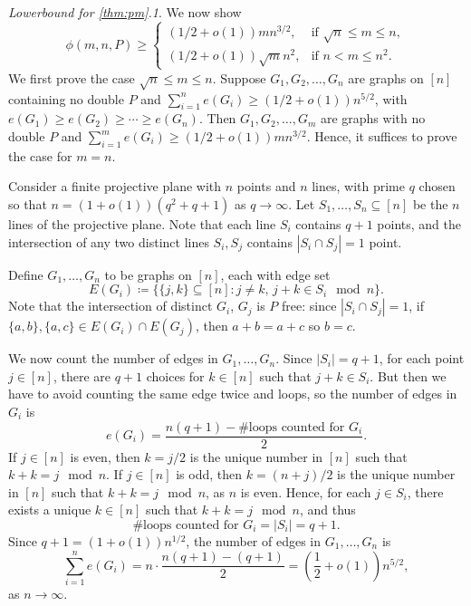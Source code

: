 \documentclass[12pt]{article}
\begin{document}
  \textit{Lowerbound for \ref{thm:pm}.1}. 
    We now show 
    \[ \phi(m, n, P) \geq \begin{cases}
      (1/2 + o(1))mn^{3/2}, & \text{if } \sqrt{n} \leq m \leq n, \\
      (1/2 + o(1))\sqrt{m}n^2, & \text{if }  n < m \leq n^2.
    \end{cases}
    \]
    We first prove the case $\sqrt{n} \leq m \leq n$. Suppose $G_1, G_2, \ldots, G_n$ are graphs on $[n]$ containing no double $P$ and $\sum_{i = 1}^n e(G_i) \geq (1/2 + o(1))n^{5/2}$, with $e(G_1) \geq e(G_2) \geq \cdots \geq e(G_n)$. Then $G_1, G_2, \ldots, G_m$ are graphs with no double $P$ and $\sum_{i = 1}^m e(G_i) \geq (1/2 + o(1))mn^{3/2}$. Hence, it suffices to prove the case for $m = n$.

    Consider a finite projective plane with $n$ points and $n$ lines, with prime $q$ chosen so that $n = (1 + o(1))(q^2 + q + 1)$ as $q \to \infty$. Let $S_1, \ldots, S_n \subseteq [n]$ be the $n$ lines of the projective plane. Note that each line $S_i$ contains $q + 1$ points, and the intersection of any two distinct lines $S_i, S_j$ contains $|S_i \cap S_j| = 1$ point. 
    
    Define $G_1, \ldots, G_n$ to be graphs on $[n]$, each with edge set
    \[
      E(G_i) \coloneq \{\{j, k\} \subseteq [n] : j \neq k, \, j + k \in S_i \mod n\}.
    \]
    Note that the intersection of distinct $G_i$, $G_j$ is $P$ free: since $|S_i \cap S_j| = 1$, if $\{a, b\}, \{a, c\} \in E(G_i) \cap E(G_j)$, then $a + b = a + c$ so $b = c$. 
    
    We now count the number of edges in $G_1, \ldots, G_n$. Since $|S_i| = q + 1$, for each point $j \in [n]$, there are $q + 1$ choices for $k \in [n]$ such that $j + k \in S_i$. But then we have to avoid counting the same edge twice and loops, so the number of edges in $G_i$ is
    \[
      e(G_i) = \frac{n(q + 1) - \#\text{loops counted for } G_i}{2}.
    \]
    If $j \in [n]$ is even, then $k = j/2$ is the unique number in $[n]$ such that $k + k = j \mod n$. If $j \in [n]$ is odd, then $k = (n + j)/2$ is the unique number in $[n]$ such that $k + k = j \mod n$, as $n$ is even. Hence, for each $j \in S_i$, there exists a unique $k \in [n]$ such that $k + k = j \mod n$, and thus
    \[
      \#\text{loops counted for } G_i = |S_i| = q + 1.
    \]
    Since $q + 1 = (1 + o(1))n^{1/2}$, the number of edges in $G_1, \ldots, G_n$ is
    \[
      \sum_{i = 1}^n e(G_i) = n \cdot \frac{n(q + 1) - (q + 1)}{2} = \left(\frac{1}{2} + o(1)\right)n^{5/2},
    \]
    as $n \to \infty$. 
    
\end{document}
